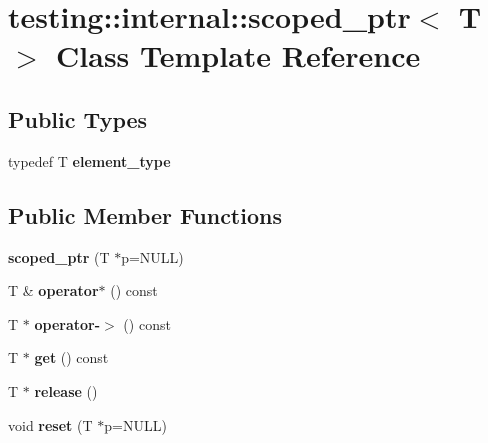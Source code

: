 \hypertarget{classtesting_1_1internal_1_1scoped__ptr}{}\section{testing\+:\+:internal\+:\+:scoped\+\_\+ptr$<$ T $>$ Class Template Reference}
\label{classtesting_1_1internal_1_1scoped__ptr}
\subsection*{Public Types}
\begin{DoxyCompactItemize}
\item 
\mbox{\label{classtesting_1_1internal_1_1scoped__ptr_ae755ffeebada8e20b68c1d1ffa91cf13}} 
typedef T {\bfseries element\+\_\+type}
\end{DoxyCompactItemize}
\subsection*{Public Member Functions}
\begin{DoxyCompactItemize}
\item 
\mbox{\label{classtesting_1_1internal_1_1scoped__ptr_adb972432999a0c63720df148964ac2a5}} 
{\bfseries scoped\+\_\+ptr} (T $\ast$p=N\+U\+LL)
\item 
\mbox{\label{classtesting_1_1internal_1_1scoped__ptr_a0aba95f68eceb6422a0b50b6f92047c2}} 
T \& {\bfseries operator$\ast$} () const
\item 
\mbox{\label{classtesting_1_1internal_1_1scoped__ptr_a2b465830a322e2c3ea420e5ccf0472f4}} 
T $\ast$ {\bfseries operator-\/$>$} () const
\item 
\mbox{\label{classtesting_1_1internal_1_1scoped__ptr_aa5984291e12453f1e81b7676d1fa26fd}} 
T $\ast$ {\bfseries get} () const
\item 
\mbox{\label{classtesting_1_1internal_1_1scoped__ptr_a7a4f3e568d81a5d8bcb5f8d6bf5130b1}} 
T $\ast$ {\bfseries release} ()
\item 
\mbox{\label{classtesting_1_1internal_1_1scoped__ptr_acac03266a43359801aff0de5c990bec0}} 
void {\bfseries reset} (T $\ast$p=N\+U\+LL)
\end{DoxyCompactItemize}
